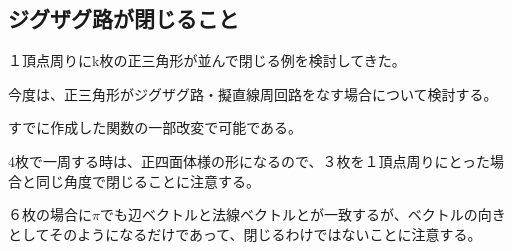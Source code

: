 \documentclass[]{article}
\begin{document}
\subsection{ジグザグ路が閉じること}\label{ux30b8ux30b0ux30b6ux30b0ux8defux304cux9589ux3058ux308bux3053ux3068}

１頂点周りにk枚の正三角形が並んで閉じる例を検討してきた。

今度は、正三角形がジグザグ路・擬直線周回路をなす場合について検討する。

すでに作成した関数の一部改変で可能である。

4枚で一周する時は、正四面体様の形になるので、３枚を１頂点周りにとった場合と同じ角度で閉じることに注意する。

６枚の場合に\(\pi\)でも辺ベクトルと法線ベクトルとが一致するが、ベクトルの向きとしてそのようになるだけであって、閉じるわけではないことに注意する。
\end{document}
